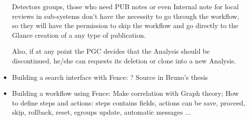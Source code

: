 \begin{itemize}
Detectors groups, those who need PUB notes or even Internal note for local reviews in sub-systems don’t have the necessity to go through the workflow, so they will have the permission to skip the workflow and go directly to the Glance creation of a any type of publication.

Also, if at any point the PGC decides that the Analysis should be discontinued, he/she can requests its deletion or clone into a new Analysis.

\item Building a search interface with Fence: ?
Source in Bruno's thesis

\item Building a workflow using Fence:
Make correlation with Graph theory;
How to define steps and actions: steps contains fields, actions can be save, proceed, skip, rollback, reset, egroups update, automatic messages ...

\end{itemize}
